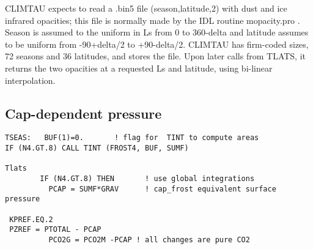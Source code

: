 \documentclass[draft]{article}  %
\begin{document}
CLIMTAU expects to read a .bin5 file (season,latitude,2) with dust and ice
infrared opacities; this file is normally made by the IDL routine mopacity.pro .
Season is assumed to the uniform in Ls from 0 to 360-delta and latitude assumes
to be uniform from -90+delta/2 to +90-delta/2. CLIMTAU has firm-coded sizes, 72
seasons and 36 latitudes, and stores the file. Upon later calls from TLATS, it
returns the two opacities at a requested Ls and latitude, using bi-linear
interpolation.


\subsection{Cap-dependent pressure} %
\vspace{-3.mm} 
\begin{verbatim}
TSEAS:   BUF(1)=0.       ! flag for  TINT to compute areas
IF (N4.GT.8) CALL TINT (FROST4, BUF, SUMF)

Tlats
        IF (N4.GT.8) THEN       ! use global integrations
          PCAP = SUMF*GRAV      ! cap_frost equivalent surface pressure

 KPREF.EQ.2
 PZREF = PTOTAL - PCAP
          PCO2G = PCO2M -PCAP ! all changes are pure CO2

\end{verbatim}
\end{document}
